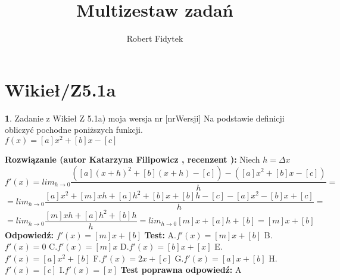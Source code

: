 \documentclass[12pt, a4paper]{article}
\title{Multizestaw zadań}
\author{Robert Fidytek}
\date{}
\theoremstyle{definition} %
\newtheorem{zad}{}
\newcommand{\kategoria}[1]{\section{#1}} %
\newcommand{\zadStart}[1]{\begin{zad}#1\newline} %
\newcommand{\zadStop}{\end{zad}}   %
\newcommand{\rozwStart}[2]{\noindent \textbf{Rozwiązanie (autor #1 , recenzent #2): }\newline} %
\newcommand{\rozwStop}{\newline}                                            %
\newcommand{\odpStart}{\noindent \textbf{Odpowiedź:}\newline}    %
\newcommand{\odpStop}{\newline}                                             %
\newcommand{\testStart}{\noindent \textbf{Test:}\newline} %
\newcommand{\testStop}{\newline} %
\newcommand{\kluczStart}{\noindent \textbf{Test poprawna odpowiedź:}\newline} %
\newcommand{\kluczStop}{\newline} %
\begin{document}
\maketitle


\kategoria{Wikieł/Z5.1a}
\zadStart{Zadanie z Wikieł Z 5.1a) moja wersja nr [nrWersji]}
Na podstawie definicji obliczyć pochodne poniższych funkcji.\\
 $f(x)=[a]x^2+[b]x-[c]$
\zadStop
\rozwStart{Katarzyna Filipowicz}{}
Niech $h=\Delta x$
$$
f'(x)=lim_{h\rightarrow 0} \frac{([a](x+h)^2+[b](x+h)-[c])-([a]x^2+[b]x-[c])}{h}=
$$ $$
=lim_{h\rightarrow 0}\frac{[a]x^2+[m]xh+[a]h^2+[b]x+[b]h-[c]-[a]x^2-[b]x+[c]}{h}=
$$ $$
=lim_{h\rightarrow 0}\frac{[m]xh+[a]h^2+[b]h}{h}=lim_{h\rightarrow 0}[m]x+[a]h+[b]=[m]x+[b]
$$
\rozwStop
\odpStart
$f'(x)=[m]x+[b]$
\odpStop
\testStart
A.$f'(x)=[m]x+[b]$
B.$f'(x)=0$
C.$f'(x)=[m]x$
D.$f'(x)=[b]x+[x]$
E.$f'(x)=[a]x^2+[b]$
F.$f'(x)=2x+[c]$
G.$f'(x)=[a]x+[b]$
H.$f'(x)=[c]$
I.$f'(x)=[x]$
\testStop
\kluczStart
A
\kluczStop
\end{document}

